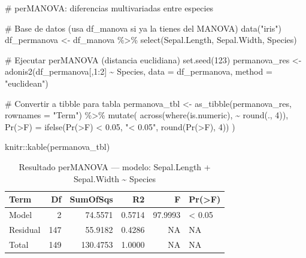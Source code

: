 \documentclass[
  spanish,
  11pt,
  a4paper,
  DIV=11,
  numbers=noendperiod]{scrartcl}
\newenvironment{Shaded}{\begin{snugshade}}{\end{snugshade}}
\newcommand{\AttributeTok}[1]{\textcolor[rgb]{0.40,0.45,0.13}{#1}}
\newcommand{\CommentTok}[1]{\textcolor[rgb]{0.37,0.37,0.37}{#1}}
\newcommand{\DecValTok}[1]{\textcolor[rgb]{0.68,0.00,0.00}{#1}}
\newcommand{\FloatTok}[1]{\textcolor[rgb]{0.68,0.00,0.00}{#1}}
\newcommand{\FunctionTok}[1]{\textcolor[rgb]{0.28,0.35,0.67}{#1}}
\newcommand{\NormalTok}[1]{\textcolor[rgb]{0.00,0.23,0.31}{#1}}
\newcommand{\OtherTok}[1]{\textcolor[rgb]{0.00,0.23,0.31}{#1}}
\newcommand{\SpecialCharTok}[1]{\textcolor[rgb]{0.37,0.37,0.37}{#1}}
\newcommand{\StringTok}[1]{\textcolor[rgb]{0.13,0.47,0.30}{#1}}
\begin{document}
\begin{Shaded}
\begin{Highlighting}[numbers=left,,]
\CommentTok{\# perMANOVA: diferencias multivariadas entre especies}

\CommentTok{\# Base de datos (usa df\_manova si ya la tienes del MANOVA)}
\FunctionTok{data}\NormalTok{(}\StringTok{"iris"}\NormalTok{)}
\NormalTok{df\_permanova }\OtherTok{\textless{}{-}}\NormalTok{ df\_manova }\SpecialCharTok{\%\textgreater{}\%}
  \FunctionTok{select}\NormalTok{(Sepal.Length, Sepal.Width, Species)}

\CommentTok{\# Ejecutar perMANOVA (distancia euclidiana)}
\FunctionTok{set.seed}\NormalTok{(}\DecValTok{123}\NormalTok{)}
\NormalTok{permanova\_res }\OtherTok{\textless{}{-}} \FunctionTok{adonis2}\NormalTok{(df\_permanova[,}\DecValTok{1}\SpecialCharTok{:}\DecValTok{2}\NormalTok{] }\SpecialCharTok{\textasciitilde{}}\NormalTok{ Species,}
                         \AttributeTok{data =}\NormalTok{ df\_permanova,}
                         \AttributeTok{method =} \StringTok{"euclidean"}\NormalTok{)}

\CommentTok{\# Convertir a tibble para tabla}
\NormalTok{permanova\_tbl }\OtherTok{\textless{}{-}} \FunctionTok{as\_tibble}\NormalTok{(permanova\_res, }\AttributeTok{rownames =} \StringTok{"Term"}\NormalTok{) }\SpecialCharTok{\%\textgreater{}\%}
  \FunctionTok{mutate}\NormalTok{(}
    \FunctionTok{across}\NormalTok{(}\FunctionTok{where}\NormalTok{(is.numeric), }\SpecialCharTok{\textasciitilde{}} \FunctionTok{round}\NormalTok{(., }\DecValTok{4}\NormalTok{)),}
    \StringTok{\textasciigrave{}}\AttributeTok{Pr(\textgreater{}F)}\StringTok{\textasciigrave{}} \OtherTok{=} \FunctionTok{ifelse}\NormalTok{(}\StringTok{\textasciigrave{}}\AttributeTok{Pr(\textgreater{}F)}\StringTok{\textasciigrave{}} \SpecialCharTok{\textless{}} \FloatTok{0.05}\NormalTok{, }\StringTok{"\textless{} 0.05"}\NormalTok{, }\FunctionTok{round}\NormalTok{(}\StringTok{\textasciigrave{}}\AttributeTok{Pr(\textgreater{}F)}\StringTok{\textasciigrave{}}\NormalTok{, }\DecValTok{4}\NormalTok{))}
\NormalTok{  )}

\NormalTok{knitr}\SpecialCharTok{::}\FunctionTok{kable}\NormalTok{(permanova\_tbl)}
\end{Highlighting}
\end{Shaded}

\begin{longtable}[]{@{}lrrrrl@{}}

\caption{\label{tbl-permanova}Resultado perMANOVA --- modelo:
Sepal.Length + Sepal.Width \textasciitilde{} Species}

\tabularnewline

\toprule\noalign{}
Term & Df & SumOfSqs & R2 & F & Pr(\textgreater F) \\
\midrule\noalign{}
\endhead
\bottomrule\noalign{}
\endlastfoot
Model & 2 & 74.5571 & 0.5714 & 97.9993 & \textless{} 0.05 \\
Residual & 147 & 55.9182 & 0.4286 & NA & NA \\
Total & 149 & 130.4753 & 1.0000 & NA & NA \\

\end{longtable}
\end{document}
